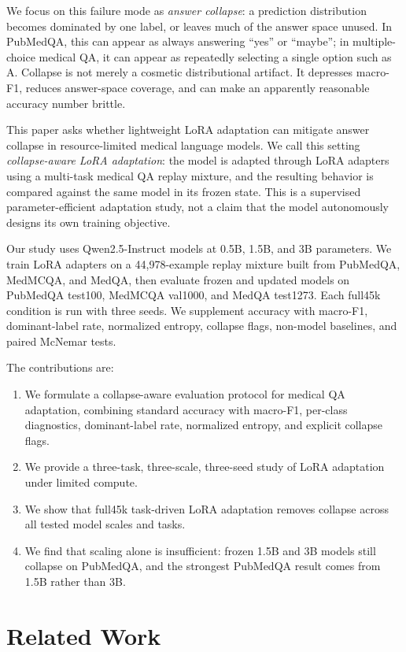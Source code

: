 \documentclass[11pt]{article}
\begin{document}
We focus on this failure mode as \emph{answer collapse}: a prediction distribution becomes dominated by one label, or leaves much of the answer space unused. In PubMedQA, this can appear as always answering ``yes'' or ``maybe''; in multiple-choice medical QA, it can appear as repeatedly selecting a single option such as A. Collapse is not merely a cosmetic distributional artifact. It depresses macro-F1, reduces answer-space coverage, and can make an apparently reasonable accuracy number brittle.

This paper asks whether lightweight LoRA adaptation can mitigate answer collapse in resource-limited medical language models. We call this setting \emph{collapse-aware LoRA adaptation}: the model is adapted through LoRA adapters using a multi-task medical QA replay mixture, and the resulting behavior is compared against the same model in its frozen state. This is a supervised parameter-efficient adaptation study, not a claim that the model autonomously designs its own training objective.

Our study uses Qwen2.5-Instruct models at 0.5B, 1.5B, and 3B parameters. We train LoRA adapters on a 44,978-example replay mixture built from PubMedQA, MedMCQA, and MedQA, then evaluate frozen and updated models on PubMedQA test100, MedMCQA val1000, and MedQA test1273. Each full45k condition is run with three seeds. We supplement accuracy with macro-F1, dominant-label rate, normalized entropy, collapse flags, non-model baselines, and paired McNemar tests.

The contributions are:
\begin{enumerate}
    \item We formulate a collapse-aware evaluation protocol for medical QA adaptation, combining standard accuracy with macro-F1, per-class diagnostics, dominant-label rate, normalized entropy, and explicit collapse flags.
    \item We provide a three-task, three-scale, three-seed study of LoRA adaptation under limited compute.
    \item We show that full45k task-driven LoRA adaptation removes collapse across all tested model scales and tasks.
    \item We find that scaling alone is insufficient: frozen 1.5B and 3B models still collapse on PubMedQA, and the strongest PubMedQA result comes from 1.5B rather than 3B.
\end{enumerate}

\section{Related Work}
\end{document}
